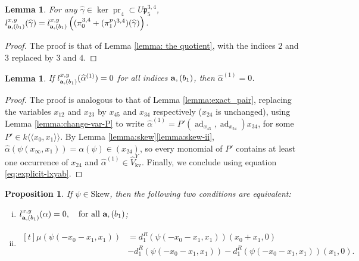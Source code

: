 \documentclass[a4paper,fleqn]{cas-sc}
\newtheorem{lemma}[theorem]{Lemma}
\newtheorem{proposition}[theorem]{Proposition}
\DeclareMathOperator{\pr}{pr}
\DeclareMathOperator{\ad}{ad}
\DeclareMathOperator{\kv}{kv}
\begin{document}
\begin{lemma}\label{lemma: the quotient_hat}
	For any $\widehat{\gamma}\in \ker \pr_4 \subset U\mathfrak{p}^{3,4}_5$,
$
		l^{x,y}_{{\bf{a}},(b_1)}(\widehat{\gamma})=l^{x,y}_{{\bf{a}},(b_1)}\left( (\pi^{3,4}_0+(\pi^p_1)^{3,4})(\widehat{\gamma}) \right).
$
\end{lemma}

\begin{proof}
    The proof is that of Lemma \ref{lemma: the quotient}, with the indices $2$ and $3$ replaced by $3$ and $4$.  
\end{proof}

\begin{lemma}
	\label{lemma: the kernel_hat}
	If $l^{x,y}_{{\bf{a}},(b_1)}(\widehat{\alpha}^{(1)})=0$ for all indices ${\bf{a}},(b_1)$, then $\widehat{\alpha}^{(1)}=0$.
\end{lemma}

\begin{proof}
The proof is analogous to that of Lemma \ref{lemma:exact_pair}, replacing the variables $x_{12}$ and $x_{23}$ by $x_{45}$ and $x_{34}$ respectively ($x_{24}$ is unchanged), using Lemma \ref{lemma:change-var-P} to write $\widehat{\alpha}^{(1)} = P'(\ad_{x_{45}},\ad_{x_{24}})x_{34}$,
for some $P' \in k\langle \langle x_0, x_1 \rangle \rangle$. By Lemma \ref{lemma:skew}\eqref{lemma:skew-ii}, $\widehat{\alpha}(\psi(x_\infty,x_1)) = \alpha(\psi) \in (x_{24})$, so every monomial of $P'$ contains at least one occurrence of $x_{24}$ and $\widehat{\alpha}^{(1)} \in \widehat{V}^Y_{\kv}$. Finally, we conclude using equation \eqref{eq:explicit-lxyab}.
\end{proof}

\begin{proposition}
If $\psi\in \mathrm{Skew}$, then the following two conditions are equivalent:
	\begin{enumerate}[(i)] %
		\item \label{prop:lab-coaction-1}
        $l_{{\bf{a}},(b_1)}^{x,y}(\alpha)=0,\quad \text{for all } \textbf{a},(b_1)$;
		\item \label{prop:lab-coaction-2}
        $\begin{aligned}[t]
		\mu(\psi(-x_0-x_1,x_1)) & =d^R_1(\psi(-x_0-x_1,x_1))(x_0+x_1,0)\\ & -d^R_{1}(\psi(-x_0-x_1,x_1))-d^R_1(\psi(-x_0-x_1,x_1))(x_1,0).
	\end{aligned}$
	\end{enumerate}
\end{proposition}
\end{document}
